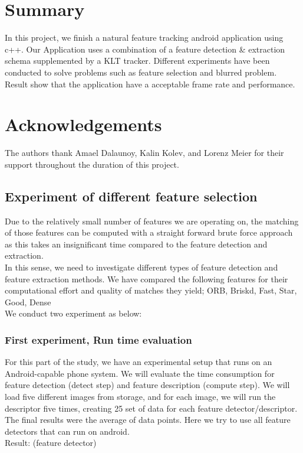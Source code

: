 \documentclass[10pt,conference,compsocconf]{IEEEtran}
\begin{document}
\section{Summary}

In this project, we finish a natural feature tracking android application using c++. Our Application uses a combination of a feature detection \& extraction schema supplemented by a KLT tracker. Different experiments have been conducted to solve problems such as feature selection and blurred problem. Result show that the application have a acceptable frame rate and performance.

\section*{Acknowledgements}
The authors thank Amael Dalaunoy, Kalin Kolev, and Lorenz Meier for their support throughout the duration of this project. 




\newpage
\appendix
\subsection{Experiment of different feature selection}
Due to the relatively small number of features we are operating on, the matching of those features can be computed with a straight forward brute force approach as this takes an insignificant time compared to the feature detection and extraction. \\
In this sense, we need to investigate different types of feature detection and feature extraction methods. We have compared the following features for their computational effort and quality of matches they yield; ORB, Briskd, Fast, Star, Good, Dense\\
We conduct two experiment as below:

\subsubsection{First experiment, Run time evaluation}

For this part of the study, we have an experimental setup that runs on an Android-capable phone system. We will evaluate the time consumption for feature detection (detect step) and feature description (compute step). We will load five different images from storage, and for each image, we will run the descriptor five times, creating 25 set of data for each feature detector/descriptor. The final results were the average of data points. Here we try to use all feature detectors that can run on android.\\
Result: (feature detector)\\
\end{document}
